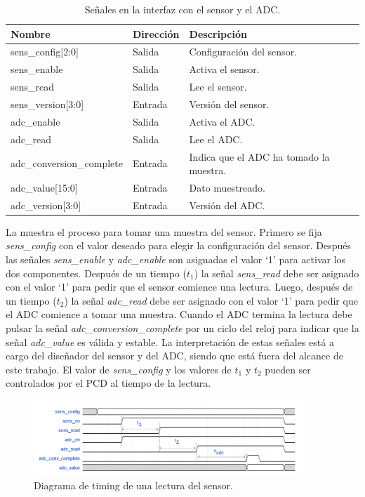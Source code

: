 \documentclass[a4paper, twoside, 11pt]{report}
\begin{document}
\begin{table}[htb]
  \centering
  \tablezebra
  \begin{tabulary}{\linewidth}{l|l|L}
    \setcounter{rownum}{0}
    \textbf{Nombre}&\textbf{Dirección}&\textbf{Descripción} \\
    \hline
    sens\_config[2:0]&Salida&Configuración del sensor. \\
    sens\_enable&Salida&Activa el sensor. \\
    sens\_read&Salida&Lee el sensor. \\
    sens\_version[3:0]&Entrada&Versión del sensor. \\
    adc\_enable&Salida&Activa el ADC. \\
    adc\_read&Salida&Lee el ADC. \\
    adc\_conversion\_complete&Entrada&Indica que el ADC ha tomado la muestra. \\
    adc\_value[15:0]&Entrada&Dato muestreado. \\
    adc\_version[3:0]&Entrada&Versión del ADC. \\
  \end{tabulary}
  \caption{Señales en la interfaz con el sensor y el ADC.}
  \label{tab:sens_adc_signals}
\end{table}

La  muestra el proceso para tomar una muestra del sensor. Primero se fija \textit{sens\_config} con el valor deseado para elegir la configuración del sensor. Después las señales \textit{sens\_enable} y \textit{adc\_enable} son asignadas el valor ‘1’ para activar los dos componentes. Después de un tiempo ($t_1$) la señal \textit{sens\_read} debe ser asignado con el valor ‘1’ para pedir que el sensor comience una lectura. Luego, después de un tiempo ($t_2$) la señal \textit{adc\_read} debe ser asignado con el valor ‘1’ para pedir que el ADC comience a tomar una muestra. Cuando el ADC termina la lectura debe pulsar la señal \textit{adc\_conversion\_complete} por un ciclo del reloj para indicar que la señal \textit{adc\_value} es válida y estable. La interpretación de estas señales está a cargo del diseñador del sensor y del ADC, siendo que está fuera del alcance de este trabajo. El valor de \textit{sens\_config} y los valores de $t_1$ y $t_2$ pueden ser controlados por el PCD al tiempo de la lectura.

\begin{figure}[htb]
  \centering
  \includegraphics[width=0.9\textwidth]{./img/sens_adc}
  \caption{Diagrama de timing de una lectura del sensor.}
  \label{fig:sens_adc}
\end{figure}
\end{document}
